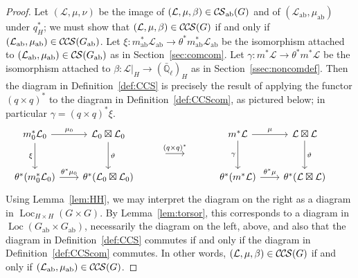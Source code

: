 \documentclass[10pt]{amsart}
\theoremstyle{plain}
\theoremstyle{definition}
\newcommand{\EE}{\mathbb{\bar Q}_\ell}
\DeclareMathOperator{\Loc}{Loc}
\newcommand{\ab}{_{\operatorname{ab}}}
\newcommand{\cs}[1]{{\mathcal{#1}}}
\newcommand{\CS}{{\mathcal{C\hskip-0.8pt S}}}
\newcommand{\CCS}{{\mathcal{C\hskip-.8pt C\hskip-0.8pt S}}}
\newcommand{\CSab}{\CS_{\operatorname{ab}}}
\begin{document}
\begin{proof}
Let $(\cs{L},\mu,\nu)$ be the image of $(\cs{L},\mu,\beta)\in \CSab(G)$ and of $(\cs{L}\ab,\mu\ab)$ under $q_H^*$;
we must show that $(\cs{L},\mu,\beta)\in \CCS(G)$ if and only if $(\cs{L}\ab,\mu\ab)\in \CCS(G\ab)$.
Let $\xi : m\ab^*\cs{L}\ab \to \theta^* m\ab^*\cs{L}\ab$ be the isomorphism attached to $(\cs{L}\ab,\mu\ab)\in \CS(G\ab)$ as in Section~\ref{sec:comcom}.
Let $\gamma : m^*\cs{L} \to \theta^* m^*\cs{L}$ be the isomorphism attached to $\beta : \cs{L}\vert_{H} \to (\EE)_{H}$ as in Section~\ref{ssec:noncomdef}.
Then the diagram in Definition~\ref{def:CCS} is precisely the result of applying the functor $(q\times q)^*$ to the diagram in Definition~\ref{def:CCScom}, as pictured below; 
in particular $\gamma = (q\times q)^* \xi$.
  \[
  \begin{tikzcd}[row sep=10, column sep = 20]
   m_0^*\cs{L}_0 \arrow{dd}[swap]{\xi} \arrow{r}{\mu_0} 
   & \cs{L}_0\boxtimes\cs{L}_0 \arrow{dd}{\vartheta}
&&&   m^*\cs{L} \arrow{dd}[swap]{\gamma} \arrow{r}{\mu} 
 & \cs{L}\boxtimes\cs{L} \arrow{dd}{\vartheta}\\
 && \arrow{r}{(q\times q)^*}  &\ & & &\\ 
   \theta^*(m_0^*\cs{L}_0) \arrow{r}{{\theta}^*\mu_0} 
 &  \theta^*(\cs{L}_0\boxtimes\cs{L}_0)
&&&   \theta^*(m^*\cs{L}) \arrow{r}{{\theta}^*\mu} 
&  \theta^*(\cs{L}\boxtimes\cs{L})
  \end{tikzcd}
\]
Using Lemma~\ref{lem:HH}, we may interpret the diagram on the right as a diagram in $\Loc_{H\times H}(G\times G)$.
By Lemma~\ref{lem:torsor}, this corresponds to a diagram in $\Loc(G\ab\times G\ab)$, necessarily the diagram on the left, above, and also that the diagram in Definition~\ref{def:CCS} commutes if and only if the diagram in Definition~\ref{def:CCScom} commutes. 
In other words, $(\cs{L},\mu,\beta)\in \CCS(G)$
if and only if $(\cs{L}\ab,\mu\ab)\in \CCS(G)$.

\end{proof}

%
\end{document}
